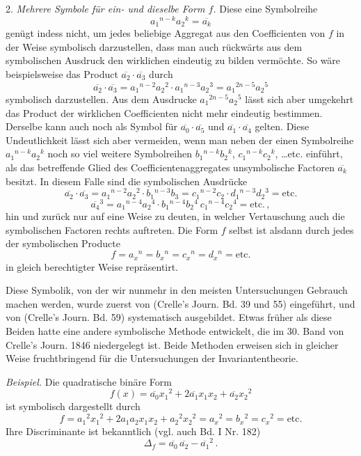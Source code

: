 \documentclass[11pt]{article}
\providecommand{\gesperrt}[1]{\textls[130]{#1}}
\providecommand{\weberpage}[1]{}
\let\Delta\varDelta
\begin{document}
\weberpage{2}
2. \textit{Mehrere Symbole für ein- und dieselbe Form $f$.} Diese eine Symbolreihe
\[
a_1{}^{n-k}a_2{}^k = \overline{a_k}
\]
genügt indess nicht, um jedes beliebige Aggregat aus den Coefficienten von $f$ in der Weise symbolisch darzustellen, dass man auch rückwärts aus dem symbolischen Ausdruck den wirklichen eindeutig zu bilden vermöchte. So wäre beispielsweise das Product $\overline{a_2}\cdot\overline{a_3}$ durch
\[
\overline{a_2}\cdot\overline{a_3} = a_1{}^{n-2}a_2{}^2\cdot a_1{}^{n-3}a_2{}^3 = a_1{}^{2n-5}a_2{}^5
\]
symbolisch darzustellen. Aus dem Ausdrucke $a_1{}^{2n-5}a_2{}^5$ lässt sich aber umgekehrt das Product der wirklichen Coefficienten nicht mehr eindeutig bestimmen. Derselbe kann auch noch als Symbol für $\overline{a_0}\cdot\overline{a_5}$ und $\overline{a_1}\cdot\overline{a_4}$ gelten. Diese Undeutlichkeit lässt sich aber vermeiden, wenn man neben der einen Symbolreihe $a_1{}^{n-k}a_2{}^k$ noch so viel weitere Symbolreihen $b_1{}^{n-k}b_2{}^k$, $c_1{}^{n-k}c_2{}^k$, \ldots etc. einführt, als das betreffende Glied des Coefficientenaggregates unsymbolische Factoren $\overline{a_k}$ besitzt. In diesem Falle sind die symbolischen Ausdrücke
\[
\overline{a_2}\cdot\overline{a_3} = a_1{}^{n-2}a_2{}^2\cdot b_1{}^{n-3}b_3 = c_1{}^{n-2}c_2\cdot d_1{}^{n-3}d_2{}^3 = \text{etc.}
\]
\[
\overline{a_4}{}^3 = a_1{}^{n-4}a_2{}^4\cdot b_1{}^{n-4}b_2{}^4\ c_1{}^{n-4}c_2{}^4 = \text{etc.}\,, %
\]
hin und zurück nur auf eine Weise zu deuten, in welcher Vertauschung auch die symbolischen Factoren rechts auftreten. Die Form $f$ selbst ist alsdann durch jedes der symbolischen Producte
\[
f = a_x{}^n = b_x{}^n = c_x{}^n = d_x{}^n = \text{etc.}
\]
in gleich berechtigter Weise repräsentirt.

Diese Symbolik, von der wir nunmehr in den meisten Untersuchungen Gebrauch machen werden, wurde zuerst von \gesperrt{Aronhold} (Crelle's Journ. Bd. 39 und 55) eingeführt, und von \gesperrt{Clebsch} (Crelle's Journ. Bd. 59) systematisch ausgebildet. Etwas früher als diese Beiden hatte \gesperrt{Cayley} eine andere symbolische Methode entwickelt, die im 30. Band von Crelle's Journ. 1846 niedergelegt ist. Beide Methoden erweisen sich in gleicher Weise fruchtbringend für die Untersuchungen der Invariantentheorie.

\textit{Beispiel.} Die quadratische binäre Form
\[
f(x) = \overline{a_0}x_1{}^2 + 2\overline{a_1}x_1x_2 + \overline{a_2}x_2{}^2
\]
ist symbolisch dargestellt durch
\[
f = a_1{}^2x_1{}^2 + 2a_1a_2x_1x_2 + a_2{}^2x_2{}^2 = a_x{}^2 = b_x{}^2 = c_x{}^2 = \text{etc.}
\]
Ihre Discriminante ist bekanntlich (vgl. auch Bd. I Nr. 182)
\[
\Delta_f = \overline{a_0}\,\overline{a_2} - \overline{a_1}{}^2\,.
\]
\end{document}
